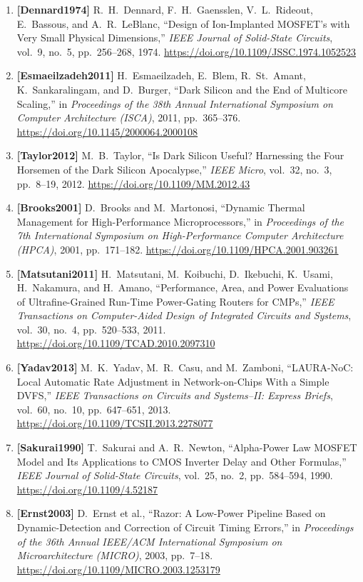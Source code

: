 \begin{enumerate}
    \item \textbf{[Dennard1974]} R.~H.~Dennard, F.~H.~Gaensslen, V.~L.~Rideout, E.~Bassous, and A.~R.~LeBlanc, ``Design of Ion-Implanted MOSFET's with Very Small Physical Dimensions,'' \emph{IEEE Journal of Solid-State Circuits}, vol.~9, no.~5, pp.~256--268, 1974. \url{https://doi.org/10.1109/JSSC.1974.1052523}
    \item \textbf{[Esmaeilzadeh2011]} H.~Esmaeilzadeh, E.~Blem, R.~St.~Amant, K.~Sankaralingam, and D.~Burger, ``Dark Silicon and the End of Multicore Scaling,'' in \emph{Proceedings of the 38th Annual International Symposium on Computer Architecture (ISCA)}, 2011, pp.~365--376. \url{https://doi.org/10.1145/2000064.2000108}
    \item \textbf{[Taylor2012]} M.~B.~Taylor, ``Is Dark Silicon Useful? Harnessing the Four Horsemen of the Dark Silicon Apocalypse,'' \emph{IEEE Micro}, vol.~32, no.~3, pp.~8--19, 2012. \url{https://doi.org/10.1109/MM.2012.43}
    \item \textbf{[Brooks2001]} D.~Brooks and M.~Martonosi, ``Dynamic Thermal Management for High-Performance Microprocessors,'' in \emph{Proceedings of the 7th International Symposium on High-Performance Computer Architecture (HPCA)}, 2001, pp.~171--182. \url{https://doi.org/10.1109/HPCA.2001.903261}
    \item \textbf{[Matsutani2011]} H.~Matsutani, M.~Koibuchi, D.~Ikebuchi, K.~Usami, H.~Nakamura, and H.~Amano, ``Performance, Area, and Power Evaluations of Ultrafine-Grained Run-Time Power-Gating Routers for CMPs,'' \emph{IEEE Transactions on Computer-Aided Design of Integrated Circuits and Systems}, vol.~30, no.~4, pp.~520--533, 2011. \url{https://doi.org/10.1109/TCAD.2010.2097310}
    \item \textbf{[Yadav2013]} M.~K.~Yadav, M.~R.~Casu, and M.~Zamboni, ``LAURA-NoC: Local Automatic Rate Adjustment in Network-on-Chips With a Simple DVFS,'' \emph{IEEE Transactions on Circuits and Systems--II: Express Briefs}, vol.~60, no.~10, pp.~647--651, 2013. \url{https://doi.org/10.1109/TCSII.2013.2278077}
    \item \textbf{[Sakurai1990]} T.~Sakurai and A.~R.~Newton, ``Alpha-Power Law MOSFET Model and Its Applications to CMOS Inverter Delay and Other Formulas,'' \emph{IEEE Journal of Solid-State Circuits}, vol.~25, no.~2, pp.~584--594, 1990. \url{https://doi.org/10.1109/4.52187}
    \item \textbf{[Ernst2003]} D.~Ernst et al., ``Razor: A Low-Power Pipeline Based on Dynamic-Detection and Correction of Circuit Timing Errors,'' in \emph{Proceedings of the 36th Annual IEEE/ACM International Symposium on Microarchitecture (MICRO)}, 2003, pp.~7--18. \url{https://doi.org/10.1109/MICRO.2003.1253179}

\end{enumerate}
